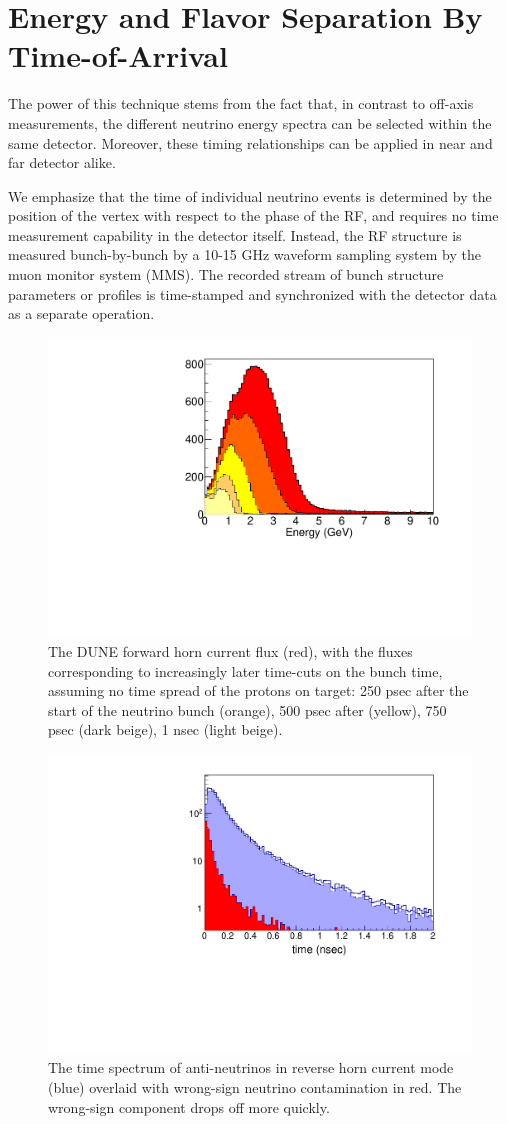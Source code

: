 \section{Energy and Flavor Separation By Time-of-Arrival}
\label{mechanism}

The power of this technique stems from the fact that, in contrast to
off-axis measurements, the different neutrino energy spectra can be
selected within the same detector. Moreover, these timing
relationships can be applied in near and far detector alike. 

We emphasize that the time of individual neutrino events is determined
by the position of the vertex with respect to the phase of the RF, and
requires no time measurement capability in the detector
itself. Instead, the RF
structure is measured bunch-by-bunch by a 10-15 GHz waveform sampling
system by the muon monitor system (MMS). The recorded stream of bunch 
structure parameters or profiles is time-stamped and synchronized with
the detector data as a separate operation.

\begin{figure}[t]
	\begin{center}
        \includegraphics[width=0.5\linewidth]{Figures/DUNEbeam_truetimingB.pdf}
	\end{center}
	\caption{The DUNE forward horn current flux (red), with the
          fluxes corresponding to increasingly later time-cuts on the
          bunch time, assuming no time spread of the protons on
          target: 250 psec after the start of the neutrino bunch
          (orange), 500 psec after (yellow), 750 psec (dark beige), 1
          nsec (light beige).}
		\label{fig:Dunebeam_truetimingB}
\end{figure}


\begin{figure}[t]
	\begin{center}
           	\includegraphics[width=0.5\linewidth]{Figures/RHCbeamcontent_log.pdf}
	\end{center}
	\caption{The time spectrum of anti-neutrinos in reverse horn
          current mode (blue) overlaid with wrong-sign neutrino
          contamination in red. The wrong-sign component drops off
          more quickly.}
		\label{fig:RHCbeamcontent_log}
\end{figure}


